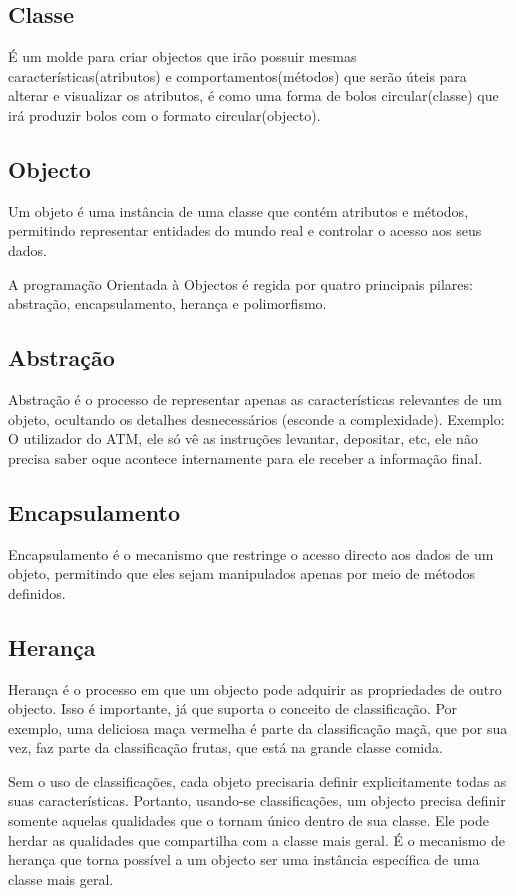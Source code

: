\documentclass[a4paper,12pt]{article}
\begin{document}
 \subsection{Classe}
É um molde para criar objectos que irão possuir mesmas características(atributos) e comportamentos(métodos) que serão úteis para alterar e visualizar os atributos, é 
como uma forma de bolos circular(classe) que irá produzir bolos com o formato circular(objecto).

 \subsection{Objecto}
 Um objeto é uma instância de uma classe que contém atributos e métodos, permitindo representar
  entidades do mundo real e controlar o acesso aos seus dados.



 A programação Orientada à Objectos é regida por quatro principais pilares: abstração, encapsulamento, herança e polimorfismo.


 \subsection{Abstração}
 Abstração é o processo de representar apenas as características relevantes de um objeto, ocultando os detalhes desnecessários (esconde a complexidade).
 Exemplo: O utilizador do ATM, ele só vê as instruções levantar, depositar, etc, ele não precisa saber oque acontece internamente 
 para ele receber a informação final.

 \subsection{Encapsulamento}
Encapsulamento é o mecanismo que restringe o acesso directo aos dados de um objeto, permitindo que eles sejam 
manipulados apenas por meio de métodos definidos.

\subsection{Herança}
Herança é o processo em que um objecto pode adquirir as propriedades 
de outro objecto. Isso é importante, já que suporta o conceito de classificação. Por 
exemplo, uma deliciosa maça vermelha é parte da classificação maçã, que por sua 
vez, faz parte da classificação frutas, que está na grande classe comida.

Sem o uso 
de classificações, cada objeto precisaria definir explicitamente todas as suas 
características. Portanto, usando-se classificações, um objecto precisa definir 
somente aquelas qualidades que o tornam único dentro de sua classe. Ele pode 
herdar as qualidades que compartilha com a classe mais geral. É o mecanismo de 
herança que torna possível a um objecto ser uma instância específica de uma classe 
mais geral.
\end{document}
